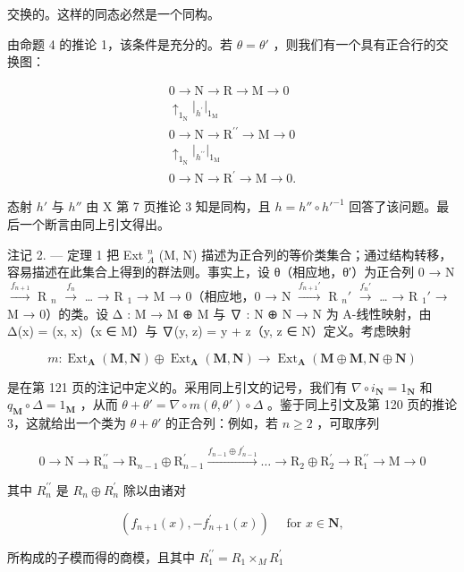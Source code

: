 交换的。这样的同态必然是一个同构。

由命题 4 的推论 1，该条件是充分的。若 \(\theta = \theta'\) ，则我们有一个具有正合行的交换图：

\[
\begin{array}{c} 0 \longrightarrow \mathrm{N} \longrightarrow \mathrm{R} \longrightarrow \mathrm{M} \longrightarrow 0 \\ \uparrow_ {1 _ {\mathrm{N}}} \Big | _ {h ^ {\prime}} \Big | _ {1 _ {\mathrm{M}}} \\ 0 \longrightarrow \mathrm{N} \longrightarrow \mathrm{R} ^ {\prime \prime} \longrightarrow \mathrm{M} \longrightarrow 0 \\ \uparrow_ {1 _ {\mathrm{N}}} \Big | _ {h ^ {\prime \prime}} \Big | _ {1 _ {\mathrm{M}}} \\ 0 \longrightarrow \mathrm{N} \longrightarrow \mathrm{R} ^ {\prime} \longrightarrow \mathrm{M} \longrightarrow 0. \end{array}
\]

态射 \(h'\) 与 \(h''\) 由 X 第 7 页推论 3 知是同构，且 \(h = h'' \circ h'^{-1}\) 回答了该问题。最后一个断言由同上引文得出。

注记 2. --- 定理 1 把 Ext \(_{A}^{n}\) (M, N) 描述为正合列的等价类集合；通过结构转移，容易描述在此集合上得到的群法则。事实上，设 θ（相应地，θ′）为正合列 0 → N \(\xrightarrow{f_{n+1}}\) R \(_{n}\) \(\xrightarrow{f_n}\) \ldots{} → R \(_{1}\) → M → 0（相应地，0 → N \(\xrightarrow{f_{n+1}'}\) R \(_{n}'\) \(\xrightarrow{f_n'}\) \ldots{} → R \(_{1}'\) → M → 0）的类。设 Δ : M → M ⊕ M 与 ∇ : N ⊕ N → N 为 A-线性映射，由 Δ(x) = (x, x)（x ∈ M）与 ∇(y, z) = y + z（y, z ∈ N）定义。考虑映射

\[
m: \operatorname{Ext} _ {\mathbf {A}} (\mathbf {M}, \mathbf {N}) \oplus \operatorname{Ext} _ {\mathbf {A}} (\mathbf {M}, \mathbf {N}) \rightarrow \operatorname{Ext} _ {\mathbf {A}} (\mathbf {M} \oplus \mathbf {M}, \mathbf {N} \oplus \mathbf {N})
\]

是在第 121 页的注记中定义的。采用同上引文的记号，我们有 \(\nabla \circ i_{\mathbf{N}} = 1_{\mathbf{N}}\) 和 \(q_{\mathbf{M}} \circ \Delta = 1_{\mathbf{M}}\) ，从而 \(\theta + \theta' = \nabla \circ m(\theta, \theta') \circ \Delta\) 。鉴于同上引文及第 120 页的推论 3，这就给出一个类为 \(\theta + \theta'\) 的正合列：例如，若 \(n \geqslant 2\) ，可取序列

\[
0 \rightarrow \mathrm{N} \rightarrow \mathrm{R} _ {n} ^ {\prime \prime} \rightarrow \mathrm{R} _ {n - 1} \oplus \mathrm{R} _ {n - 1} ^ {\prime} \xrightarrow {f _ {n - 1} \oplus f _ {n - 1} ^ {\prime}} \dots \rightarrow \mathrm{R} _ {2} \oplus \mathrm{R} _ {2} ^ {\prime} \rightarrow \mathrm{R} _ {1} ^ {\prime \prime} \rightarrow \mathrm{M} \rightarrow 0
\]

其中 \(R_{n}^{\prime\prime}\) 是 \(R_{n} \oplus R_{n}^{\prime}\) 除以由诸对

\[
\left(f _ {n + 1} (x), - f _ {n + 1} ^ {\prime} (x)\right) \quad \text { for } x \in \mathbf {N},
\]

所构成的子模而得的商模，且其中 \(R_{1}^{\prime\prime}=R_{1}\times_{M}R_{1}^{\prime}\)
